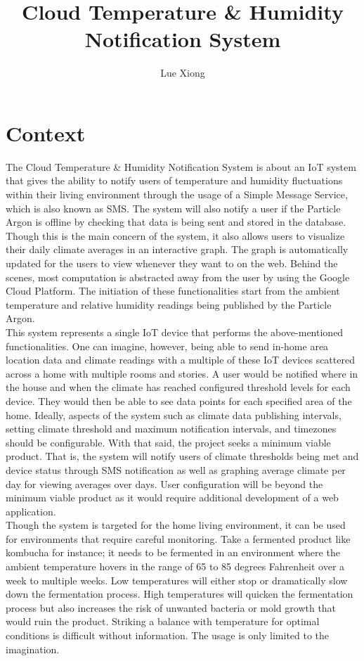 \documentclass{article}
\title{Cloud Temperature \& Humidity Notification System}
\author{Lue Xiong}
\begin{document}
\maketitle
\newpage

\tableofcontents
\newpage

\obeylines

\section{Context}
The Cloud Temperature \& Humidity Notification System is about an IoT system that gives the ability to notify users of temperature and humidity fluctuations within their living environment through the usage of a Simple Message Service, which is also known as SMS. The system will also notify a user if the Particle Argon is offline by checking that data is being sent and stored in the database. Though this is the main concern of the system, it also allows users to visualize their daily climate averages in an interactive graph. The graph is automatically updated for the users to view whenever they want to on the web. Behind the scenes, most computation is abstracted away from the user by using the Google Cloud Platform. The initiation of these functionalities start from the ambient temperature and relative humidity readings being published by the Particle Argon.\\

This system represents a single IoT device that performs the above-mentioned functionalities. One can imagine, however, being able to send in-home area location data and climate readings with a multiple of these IoT devices scattered across a home with multiple rooms and stories. A user would be notified where in the house and when the climate has reached configured threshold levels for each device. They would then be able to see data points for each specified area of the home. Ideally, aspects of the system such as climate data publishing intervals, setting climate threshold and maximum notification intervals, and timezones should be configurable. With that said, the project seeks a minimum viable product. That is, the system will notify users of climate thresholds being met and device status through SMS notification as well as graphing average climate per day for viewing averages over days. User configuration will be beyond the minimum viable product as it would require additional development of a web application.\\

Though the system is targeted for the home living environment, it can be used for environments that require careful monitoring. Take a fermented product like kombucha for instance; it needs to be fermented in an environment where the ambient temperature hovers in the range of 65 to 85 degrees Fahrenheit over a week to multiple weeks. Low temperatures will either stop or dramatically slow down the fermentation process. High temperatures will quicken the fermentation process but also increases the risk of unwanted bacteria or mold growth that would ruin the product. Striking a balance with temperature for optimal conditions is difficult without information. The usage is only limited to the imagination.\\
\end{document}
